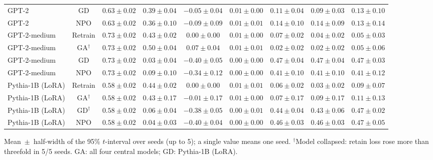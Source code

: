 {\begin{longtable}{@{\extracolsep{\fill}}lcccccccc@{}}
GPT-2 & GD & $0.63 \pm 0.02$ & $0.39 \pm 0.04$ & $-0.05 \pm 0.04$ & $0.01 \pm 0.00$ & $0.11 \pm 0.04$ & $0.09 \pm 0.03$ & $0.13 \pm 0.10$ \\
GPT-2 & NPO & $0.63 \pm 0.02$ & $0.36 \pm 0.10$ & $-0.09 \pm 0.09$ & $0.01 \pm 0.01$ & $0.14 \pm 0.10$ & $0.14 \pm 0.09$ & $0.13 \pm 0.14$ \\
GPT-2-medium & Retrain & $0.73 \pm 0.02$ & $0.43 \pm 0.02$ & $0.00 \pm 0.00$ & $0.01 \pm 0.00$ & $0.07 \pm 0.02$ & $0.04 \pm 0.02$ & $0.05 \pm 0.03$ \\
GPT-2-medium & GA$^{\dagger}$ & $0.73 \pm 0.02$ & $0.50 \pm 0.04$ & $0.07 \pm 0.04$ & $0.01 \pm 0.01$ & $0.02 \pm 0.02$ & $0.02 \pm 0.02$ & $0.05 \pm 0.06$ \\
GPT-2-medium & GD & $0.73 \pm 0.02$ & $0.03 \pm 0.04$ & $-0.40 \pm 0.05$ & $0.00 \pm 0.00$ & $0.47 \pm 0.04$ & $0.47 \pm 0.04$ & $0.47 \pm 0.03$ \\
GPT-2-medium & NPO & $0.73 \pm 0.02$ & $0.09 \pm 0.10$ & $-0.34 \pm 0.12$ & $0.00 \pm 0.00$ & $0.41 \pm 0.10$ & $0.41 \pm 0.10$ & $0.41 \pm 0.12$ \\
Pythia-1B (LoRA) & Retrain & $0.58 \pm 0.02$ & $0.44 \pm 0.02$ & $0.00 \pm 0.00$ & $0.01 \pm 0.01$ & $0.06 \pm 0.02$ & $0.03 \pm 0.02$ & $0.09 \pm 0.07$ \\
Pythia-1B (LoRA) & GA$^{\dagger}$ & $0.58 \pm 0.02$ & $0.43 \pm 0.17$ & $-0.01 \pm 0.17$ & $0.01 \pm 0.00$ & $0.07 \pm 0.17$ & $0.09 \pm 0.17$ & $0.11 \pm 0.13$ \\
Pythia-1B (LoRA) & GD$^{\dagger}$ & $0.58 \pm 0.02$ & $0.06 \pm 0.04$ & $-0.38 \pm 0.05$ & $0.00 \pm 0.01$ & $0.44 \pm 0.04$ & $0.43 \pm 0.06$ & $0.47 \pm 0.02$ \\
Pythia-1B (LoRA) & NPO & $0.58 \pm 0.02$ & $0.04 \pm 0.03$ & $-0.40 \pm 0.04$ & $0.00 \pm 0.00$ & $0.46 \pm 0.03$ & $0.46 \pm 0.03$ & $0.47 \pm 0.05$ \\
\end{longtable}
Mean~$\pm$~half-width of the 95\% $t$-interval over seeds (up to 5); a single value means one seed. $^{\dagger}$Model collapsed: retain loss rose more than threefold in 5/5 seeds. GA: all four central models; GD: Pythia-1B (LoRA).\par
}
